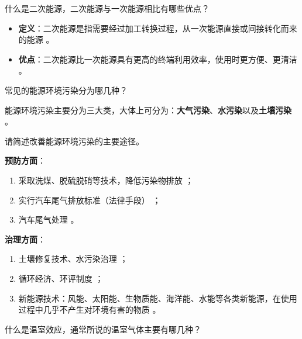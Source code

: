 \begin{problem}\label{exer:think_01_intro_03}
什么是二次能源，二次能源与一次能源相比有哪些优点？
\end{problem}

\begin{solution}
\begin{itemize}
\item \textbf{定义}：二次能源是指需要经过加工转换过程，从一次能源直接或间接转化而来的能源 。
\item \textbf{优点}：二次能源比一次能源具有更高的终端利用效率，使用时更方便、更清洁 。
\end{itemize}
\end{solution}

\begin{problem}\label{exer:think_01_intro_04}
常见的能源环境污染分为哪几种？
\end{problem}

\begin{solution}
能源环境污染主要分为三大类，大体上可分为：\textbf{大气污染}、\textbf{水污染}以及\textbf{土壤污染} 。
\end{solution}

\begin{problem}\label{exer:think_01_intro_05}
请简述改善能源环境污染的主要途径。
\end{problem}

\begin{solution}
\textbf{预防方面}：
\begin{enumerate}
\item 采取洗煤、脱硫脱硝等技术，降低污染物排放 ；
\item 实行汽车尾气排放标准（法律手段） ；
\item 汽车尾气处理 。
\end{enumerate}
\textbf{治理方面}：
\begin{enumerate}
\item 土壤修复技术、水污染治理 ；
\item 循环经济、环评制度 ；
\item 新能源技术：风能、太阳能、生物质能、海洋能、水能等各类新能源，在使用过程中几乎不产生对环境有害的物质 。
\end{enumerate}
\end{solution}

\begin{problem}\label{exer:think_01_intro_06}
什么是温室效应，通常所说的温室气体主要有哪几种？
\end{problem}

